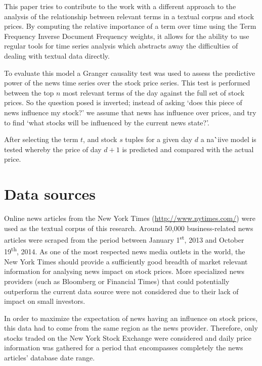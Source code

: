 \documentclass{article}
\begin{document}
\par
This paper tries to contribute to the work with a different approach to the analysis of the relationship between relevant terms in a textual corpus and stock prices. By computing the relative importance of a term over time using the Term Frequency Inverse Document Frequency \citep{TFIDF paper} weights, it allows for the ability to use regular tools for time series analysis which abstracts away the difficulties of dealing with textual data directly.
\par
To evaluate this model a Granger causality test \citep{GRANGER TEST} was used to assess the predictive power of the news time series over the stock price series. This test is performed between the top \(n\) most relevant terms of the day against the full set of stock prices. So the question posed is inverted; instead of asking `does this piece of news influence my stock?' we assume that news has influence over prices, and try to find `what stocks will be influenced by the current news state?'.
\par
After selecting the term \(t\), and stock \(s\) tuples for a given day \(d\) a na\``{i}ive model is tested whereby the price of day \(d+1\) is predicted and compared with the actual price.
\section{Data sources}
Online news articles from the New York Times (\url{http://www.nytimes.com/}) were used as the textual corpus of this research. Around 50,000 business-related news articles were scraped from the period between January 1\textsuperscript{st}, 2013 and October 19\textsuperscript{th}, 2014. As one of the most respected news media outlets in the world, the New York Times should provide a sufficiently good breadth of market relevant information for analysing news impact on stock prices. More specialized news providers (such as Bloomberg or Financial Times) that could potentially outperform the current data source were not considered due to their lack of impact on small investors.
\par
In order to maximize the expectation of news having an influence on stock prices, this data had to come from the same region as the news provider. Therefore, only stocks traded on the New York Stock Exchange were considered and daily price information was gathered for a period that encompasses completely the news articles' database date range.
\end{document}
